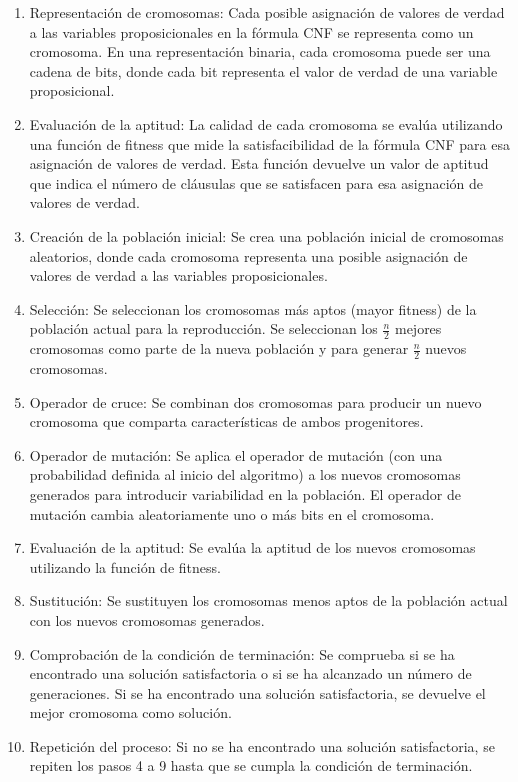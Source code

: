 \documentclass{article}
\begin{document}
        \begin{enumerate}
            \item Representación de cromosomas:  Cada posible asignación de valores de verdad a las 
            variables proposicionales en la fórmula CNF se representa como un cromosoma. 
            En una representación binaria, cada cromosoma puede ser una cadena de bits, donde cada bit 
            representa el valor de verdad de una variable proposicional.
            \item Evaluación de la aptitud: La calidad de cada cromosoma se evalúa utilizando una 
            función de fitness que mide la satisfacibilidad de la fórmula CNF para esa 
            asignación de valores de verdad. Esta función devuelve un valor de aptitud que 
            indica el número de cláusulas que se satisfacen para esa asignación de valores de verdad.
            \item Creación de la población inicial: Se crea una población inicial de cromosomas aleatorios, 
            donde cada cromosoma representa una posible asignación de valores de verdad a 
            las variables proposicionales.
            \item Selección: Se seleccionan los cromosomas más aptos (mayor fitness) de la población actual para la 
            reproducción. Se seleccionan los $\frac{n}{2}$ mejores cromosomas como parte de la nueva población y 
            para generar $\frac{n}{2}$ nuevos cromosomas. 
            \item Operador de cruce: Se combinan dos cromosomas para producir 
            un nuevo cromosoma que comparta características de ambos progenitores.
            \item Operador de mutación: Se aplica el operador de mutación (con una probabilidad definida al inicio del algoritmo) 
            a los nuevos cromosomas 
            generados para introducir variabilidad en la población. El operador de mutación cambia 
            aleatoriamente uno o más bits en el cromosoma.
            \item Evaluación de la aptitud: Se evalúa la aptitud de los nuevos cromosomas utilizando 
            la función de fitness.
            \item Sustitución: Se sustituyen los cromosomas menos aptos de la población actual con 
            los nuevos cromosomas generados.
            \item Comprobación de la condición de terminación: Se comprueba si se ha encontrado una 
            solución satisfactoria o si se ha alcanzado un número de generaciones. 
            Si se ha encontrado una solución satisfactoria, se devuelve el mejor cromosoma como solución.
            \item Repetición del proceso: Si no se ha encontrado una solución satisfactoria, 
            se repiten los pasos 4 a 9 hasta que se cumpla la condición de terminación.
        \end{enumerate}
        
\end{document}
